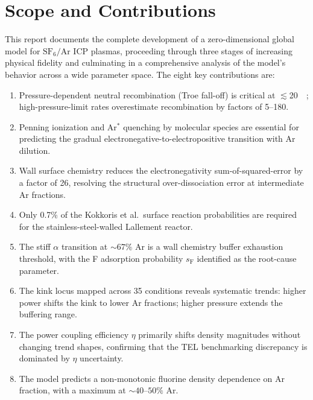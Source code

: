 \documentclass[11pt,a4paper]{report}
\newcommand{\SFsix}{\mathrm{SF}_6}
\newcommand{\Ar}{\mathrm{Ar}}
\begin{document}
\section{Scope and Contributions}
\label{sec:intro_scope}

This report documents the complete development of a zero-dimensional global model for $\SFsix/\Ar$ ICP plasmas, proceeding through three stages of increasing physical fidelity and culminating in a comprehensive analysis of the model's behavior across a wide parameter space.  The eight key contributions are:

\begin{enumerate}
    \item Pressure-dependent neutral recombination (Troe fall-off) is critical at $\lesssim$\SI{20}{\milli\torr}; high-pressure-limit rates overestimate recombination by factors of 5--180.
    \item Penning ionization and Ar$^*$ quenching by molecular species are essential for predicting the gradual electronegative-to-electropositive transition with Ar dilution.
    \item Wall surface chemistry reduces the electronegativity sum-of-squared-error by a factor of 26, resolving the structural over-dissociation error at intermediate Ar fractions.
    \item Only 0.7\% of the Kokkoris et al.\ surface reaction probabilities are required for the stainless-steel-walled Lallement reactor.
    \item The stiff $\alpha$ transition at ${\sim}67\%$ Ar is a wall chemistry buffer exhaustion threshold, with the F adsorption probability $s_\mathrm{F}$ identified as the root-cause parameter.
    \item The kink locus mapped across 35 conditions reveals systematic trends: higher power shifts the kink to lower Ar fractions; higher pressure extends the buffering range.
    \item The power coupling efficiency $\eta$ primarily shifts density magnitudes without changing trend shapes, confirming that the TEL benchmarking discrepancy is dominated by $\eta$ uncertainty.
    \item The model predicts a non-monotonic fluorine density dependence on Ar fraction, with a maximum at ${\sim}40$--$50\%$ Ar.
\end{enumerate}
\end{document}
